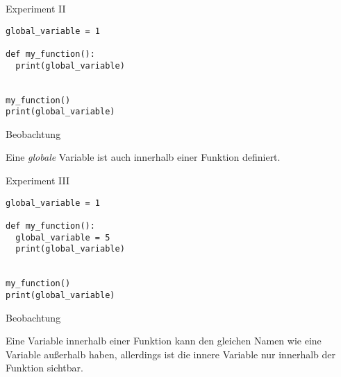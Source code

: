 \begin{fragile}
	
\begin{block}{Experiment II}
\vspace{2pt}

\begin{verbatim}
global_variable = 1

def my_function(): 
  print(global_variable)
 

my_function()
print(global_variable)
\end{verbatim}


\vspace{12pt}

\end{block}

\begin{exampleblock}{Beobachtung}

\pause 

Eine \emph{globale} Variable ist auch innerhalb einer Funktion definiert.  
\end{exampleblock}

	
\end{fragile}

\begin{fragile}

\begin{block}{Experiment III}
\vspace{2pt}

\begin{verbatim}
global_variable = 1

def my_function(): 
  global_variable = 5
  print(global_variable)


my_function()
print(global_variable)
\end{verbatim}
\vspace{12pt}

\end{block}

\begin{exampleblock}{Beobachtung}

\pause 

Eine Variable innerhalb einer Funktion kann den gleichen Namen wie eine Variable außerhalb haben, allerdings ist die innere Variable nur innerhalb der Funktion sichtbar. 
\end{exampleblock}


\end{fragile}


